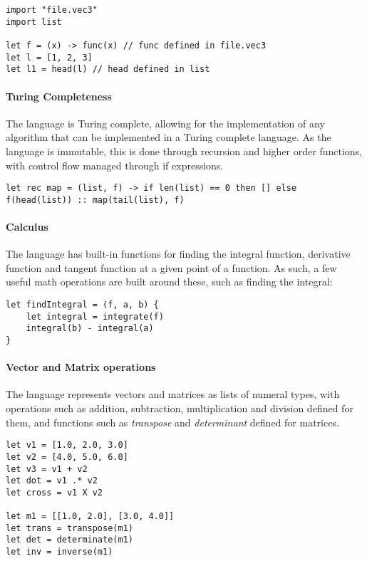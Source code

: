 \begin{verbatim}
import "file.vec3"
import list

let f = (x) -> func(x) // func defined in file.vec3
let l = [1, 2, 3]
let l1 = head(l) // head defined in list
\end{verbatim}

\paragraph{Turing Completeness} The language is Turing complete, allowing for the implementation of any
algorithm that can be implemented in a Turing complete language.
As the language is immutable, this is done through recursion and higher order functions, with control flow
managed through if expressions.

\begin{verbatim}
let rec map = (list, f) -> if len(list) == 0 then [] else f(head(list)) :: map(tail(list), f)
\end{verbatim}

\paragraph{Calculus} The language has built-in functions for finding the integral function, derivative function
and tangent function at a given point of a function.
As such, a few useful math operations are built around these, such as finding the integral:

\begin{verbatim}
let findIntegral = (f, a, b) {
    let integral = integrate(f)
    integral(b) - integral(a)
}
\end{verbatim}

\paragraph{Vector and Matrix operations} The language represents vectors and matrices as lists of numeral types, with
operations such as addition, subtraction, multiplication and division defined for them, and functions such as \textit{transpose} and \textit{determinant} defined for matrices.

\begin{verbatim}
let v1 = [1.0, 2.0, 3.0]
let v2 = [4.0, 5.0, 6.0]
let v3 = v1 + v2
let dot = v1 .* v2
let cross = v1 X v2

let m1 = [[1.0, 2.0], [3.0, 4.0]]
let trans = transpose(m1)
let det = determinate(m1)
let inv = inverse(m1)
\end{verbatim}

